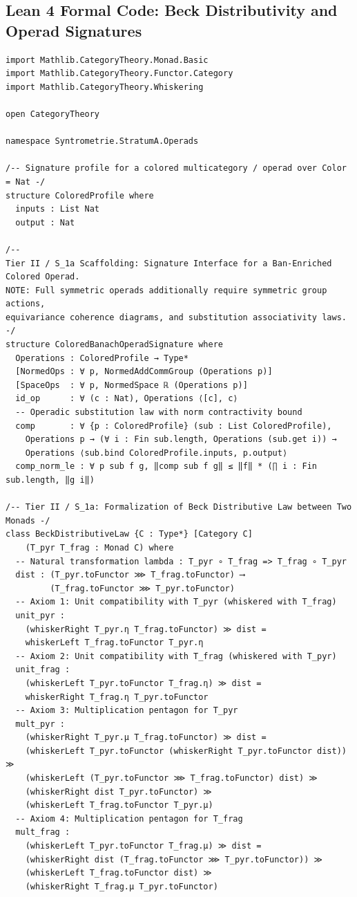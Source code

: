 \documentclass[
    12pt,
    a4paper,
    headings=normal,
    twoside=true,
    BCOR=8mm,
]{scrbook}
\begin{document}
\subsection*{Lean 4 Formal Code: Beck Distributivity and Operad Signatures}
\begin{verbatim}
import Mathlib.CategoryTheory.Monad.Basic
import Mathlib.CategoryTheory.Functor.Category
import Mathlib.CategoryTheory.Whiskering

open CategoryTheory

namespace Syntrometrie.StratumA.Operads

/-- Signature profile for a colored multicategory / operad over Color = Nat -/
structure ColoredProfile where
  inputs : List Nat
  output : Nat

/--
Tier II / S_1a Scaffolding: Signature Interface for a Ban-Enriched Colored Operad.
NOTE: Full symmetric operads additionally require symmetric group actions,
equivariance coherence diagrams, and substitution associativity laws.
-/
structure ColoredBanachOperadSignature where
  Operations : ColoredProfile → Type*
  [NormedOps : ∀ p, NormedAddCommGroup (Operations p)]
  [SpaceOps  : ∀ p, NormedSpace ℝ (Operations p)]
  id_op      : ∀ (c : Nat), Operations ⟨[c], c⟩
  -- Operadic substitution law with norm contractivity bound
  comp       : ∀ {p : ColoredProfile} (sub : List ColoredProfile),
    Operations p → (∀ i : Fin sub.length, Operations (sub.get i)) →
    Operations ⟨sub.bind ColoredProfile.inputs, p.output⟩
  comp_norm_le : ∀ p sub f g, ‖comp sub f g‖ ≤ ‖f‖ * (∏ i : Fin sub.length, ‖g i‖)

/-- Tier II / S_1a: Formalization of Beck Distributive Law between Two Monads -/
class BeckDistributiveLaw {C : Type*} [Category C]
    (T_pyr T_frag : Monad C) where
  -- Natural transformation lambda : T_pyr ∘ T_frag => T_frag ∘ T_pyr
  dist : (T_pyr.toFunctor ⋙ T_frag.toFunctor) ⟶
         (T_frag.toFunctor ⋙ T_pyr.toFunctor)
  -- Axiom 1: Unit compatibility with T_pyr (whiskered with T_frag)
  unit_pyr :
    (whiskerRight T_pyr.η T_frag.toFunctor) ≫ dist =
    whiskerLeft T_frag.toFunctor T_pyr.η
  -- Axiom 2: Unit compatibility with T_frag (whiskered with T_pyr)
  unit_frag :
    (whiskerLeft T_pyr.toFunctor T_frag.η) ≫ dist =
    whiskerRight T_frag.η T_pyr.toFunctor
  -- Axiom 3: Multiplication pentagon for T_pyr
  mult_pyr :
    (whiskerRight T_pyr.μ T_frag.toFunctor) ≫ dist =
    (whiskerLeft T_pyr.toFunctor (whiskerRight T_pyr.toFunctor dist)) ≫
    (whiskerLeft (T_pyr.toFunctor ⋙ T_frag.toFunctor) dist) ≫
    (whiskerRight dist T_pyr.toFunctor) ≫
    (whiskerLeft T_frag.toFunctor T_pyr.μ)
  -- Axiom 4: Multiplication pentagon for T_frag
  mult_frag :
    (whiskerLeft T_pyr.toFunctor T_frag.μ) ≫ dist =
    (whiskerRight dist (T_frag.toFunctor ⋙ T_pyr.toFunctor)) ≫
    (whiskerLeft T_frag.toFunctor dist) ≫
    (whiskerRight T_frag.μ T_pyr.toFunctor)


\end{verbatim}
\end{document}

